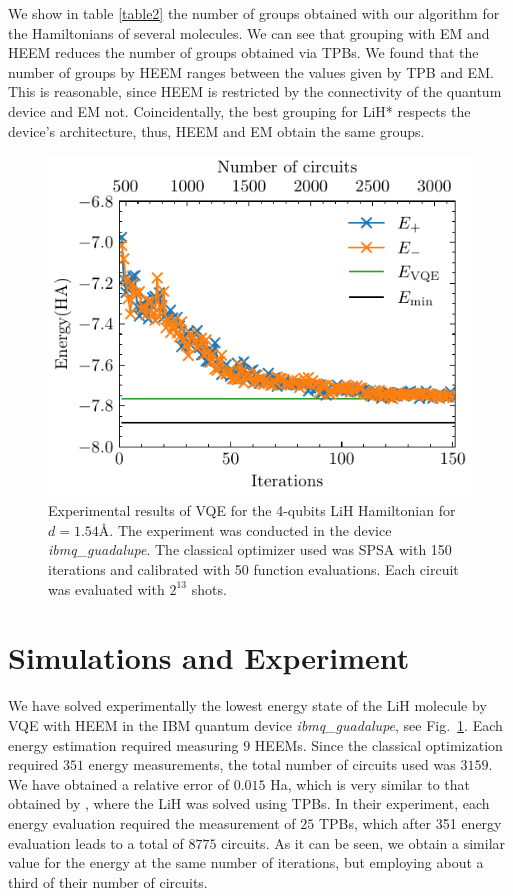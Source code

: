 \documentclass[11pt, twocolumn]{article}
\begin{document}
We show in table \ref{table2} the number of groups obtained with our algorithm for the Hamiltonians of several molecules. We can see that grouping with EM and HEEM reduces the number of groups obtained via TPBs. We found that the number of groups by HEEM ranges between the values given by TPB and EM. This is reasonable, since HEEM is restricted by the connectivity of the quantum device and EM not. Coincidentally, the best grouping for LiH* respects the device's architecture, thus, HEEM and EM obtain the same groups.

\begin{figure}[b!]
    \centering
    \includegraphics[width=0.95\linewidth]{Experiment.pdf}
    \caption{Experimental results of VQE for the 4-qubits LiH Hamiltonian for $d=1.54$\r{A}. The experiment was conducted in the device \emph{ibmq\_guadalupe}. The classical optimizer used was SPSA with 150 iterations and calibrated with 50 function evaluations. Each circuit was evaluated with $2^{13}$ shots.}
    \label{fig:experiment}
\end{figure}

\section{Simulations and Experiment}
We have solved experimentally the lowest energy state of the LiH molecule by VQE with HEEM in the IBM quantum device \emph{ibmq\_guadalupe}, see Fig.~\ref{fig:experiment}. Each energy estimation required measuring $9$ HEEMs. Since the classical optimization required $351$ energy measurements, the total number of circuits used was $3159$. We have obtained a relative error of $0.015$ Ha, which is very similar to that obtained by \cite{kandala2017hardware}, where the LiH was solved using TPBs. In their experiment, each energy evaluation required the measurement of $25$ TPBs, which after 351 energy evaluation leads to a total of $8775$ circuits. As it can be seen, we obtain a similar value for the energy at the same number of iterations, but employing about a third of their number of circuits.
\end{document}
